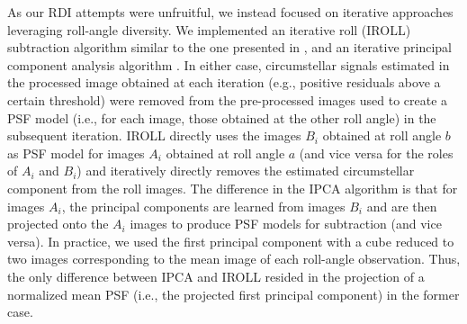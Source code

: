 \documentclass[longauth]{aa}
\begin{document}
\begin{appendix}
    
As our RDI attempts were unfruitful, %
we instead focused on iterative approaches leveraging roll-angle diversity. 
We implemented an iterative roll (IROLL) subtraction algorithm similar to the one presented in \citet{Heap2000}, and an iterative principal component analysis algorithm \citep[IPCA; e.g.,][]{Pairet2021}. In either case, circumstellar signals estimated in the processed image obtained at each iteration (e.g., positive residuals above a certain threshold) were removed from the pre-processed images used to create a PSF model (i.e., for each image, those obtained at the other roll angle) in the subsequent iteration.
IROLL directly uses the images $B_i$ obtained at roll angle $b$ as PSF model for images $A_i$ obtained at roll angle $a$ (and vice versa for the roles of $A_i$ and $B_i$) and iteratively directly removes the estimated circumstellar component from the roll images.
The difference in the IPCA algorithm is that for images $A_i$, the principal components are learned from images $B_i$ and are then projected onto the $A_i$ images to produce PSF models for subtraction (and vice versa). In practice, we used the first principal component with a cube reduced to two images corresponding to the mean image of each roll-angle observation. Thus, the only difference between IPCA and IROLL resided in the projection of a normalized mean PSF (i.e., the projected first principal component) in the former case.
    

\end{appendix}
\end{document}
